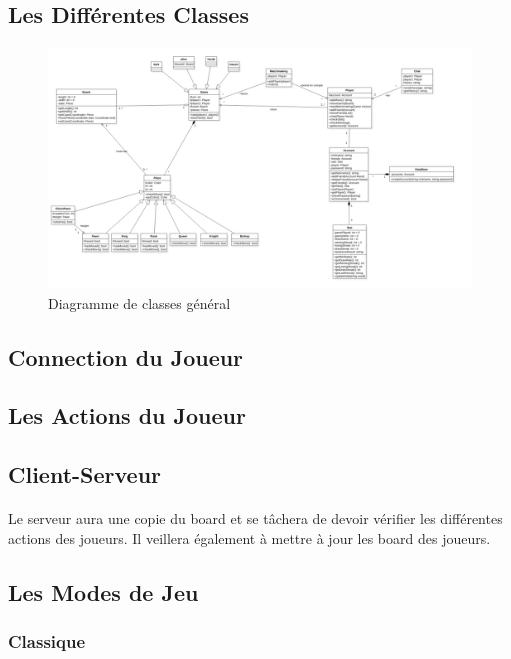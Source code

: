 \documentclass[10pt, a4paper]{article}
\begin{document}
\subsection{Les Différentes Classes}
	
\begin{figure}[p]
\includegraphics[scale=0.5]{ClassDiagram.png}
\caption{Diagramme de classes général}
\label{CD} %
\end{figure}

		
\subsection{Connection du Joueur}
		
\subsection{Les Actions du Joueur}

\subsection{Client-Serveur}
\paragraph{}Le serveur aura une copie du board et se tâchera de devoir vérifier les différentes actions des joueurs. Il veillera également à mettre à jour les board des joueurs.

\subsection{Les Modes de Jeu}
\subsubsection{Classique}
\end{document}
